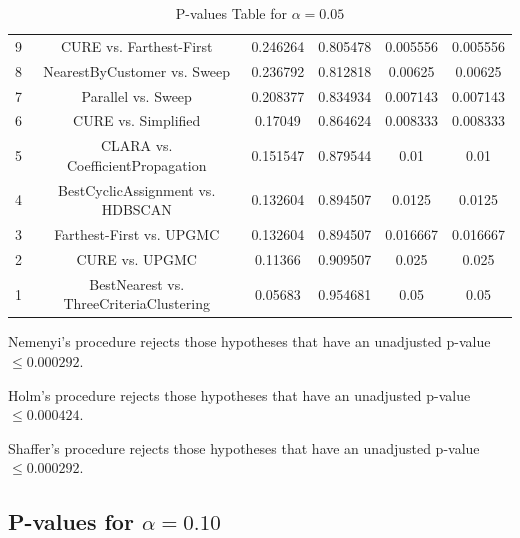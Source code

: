 \documentclass[a4paper,10pt]{article}
\begin{document}
\begin{landscape}
\begin{table}[!htp]
\begin{tabular}{cccccc}
9&CURE vs. Farthest-First&0.246264&0.805478&0.005556&0.005556\\
8&NearestByCustomer vs. Sweep&0.236792&0.812818&0.00625&0.00625\\
7&Parallel vs. Sweep&0.208377&0.834934&0.007143&0.007143\\
6&CURE vs. Simplified&0.17049&0.864624&0.008333&0.008333\\
5&CLARA vs. CoefficientPropagation&0.151547&0.879544&0.01&0.01\\
4&BestCyclicAssignment vs. HDBSCAN&0.132604&0.894507&0.0125&0.0125\\
3&Farthest-First vs. UPGMC&0.132604&0.894507&0.016667&0.016667\\
2&CURE vs. UPGMC&0.11366&0.909507&0.025&0.025\\
1&BestNearest vs. ThreeCriteriaClustering&0.05683&0.954681&0.05&0.05\\
\hline
\end{tabular}
\caption{P-values Table for $\alpha=0.05$}
\end{table}Nemenyi's procedure rejects those hypotheses that have an unadjusted p-value $\le0.000292$.

Holm's procedure rejects those hypotheses that have an unadjusted p-value $\le0.000424$.

Shaffer's procedure rejects those hypotheses that have an unadjusted p-value $\le0.000292$.

\pagebreak

\subsection{P-values for $\alpha=0.10$}


\end{landscape}
\end{document}
